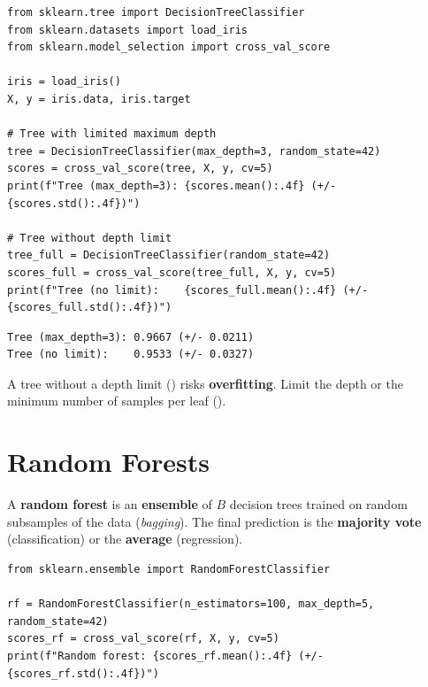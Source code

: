 \begin{codeblock}[title=\textbf{Python}]
\begin{verbatim}
from sklearn.tree import DecisionTreeClassifier
from sklearn.datasets import load_iris
from sklearn.model_selection import cross_val_score

iris = load_iris()
X, y = iris.data, iris.target

# Tree with limited maximum depth
tree = DecisionTreeClassifier(max_depth=3, random_state=42)
scores = cross_val_score(tree, X, y, cv=5)
print(f"Tree (max_depth=3): {scores.mean():.4f} (+/- {scores.std():.4f})")

# Tree without depth limit
tree_full = DecisionTreeClassifier(random_state=42)
scores_full = cross_val_score(tree_full, X, y, cv=5)
print(f"Tree (no limit):    {scores_full.mean():.4f} (+/- {scores_full.std():.4f})")
\end{verbatim}
\end{codeblock}

\begin{codeoutput}
\begin{verbatim}
Tree (max_depth=3): 0.9667 (+/- 0.0211)
Tree (no limit):    0.9533 (+/- 0.0327)
\end{verbatim}
\end{codeoutput}

\begin{warning}
A tree without a depth limit () risks \textbf{overfitting}. Limit the depth or the minimum number of samples per leaf ().
\end{warning}

\section{Random Forests}
\label{sec:forets_aleatoires}


\begin{definition}
A \textbf{random forest} is an \textbf{ensemble} of $B$ decision trees trained on random subsamples of the data (\textit{bagging}). The final prediction is the \textbf{majority vote} (classification) or the \textbf{average} (regression).
\end{definition}

\begin{codeblock}[title=\textbf{Python}]
\begin{verbatim}
from sklearn.ensemble import RandomForestClassifier

rf = RandomForestClassifier(n_estimators=100, max_depth=5, random_state=42)
scores_rf = cross_val_score(rf, X, y, cv=5)
print(f"Random forest: {scores_rf.mean():.4f} (+/- {scores_rf.std():.4f})")
\end{verbatim}
\end{codeblock}

